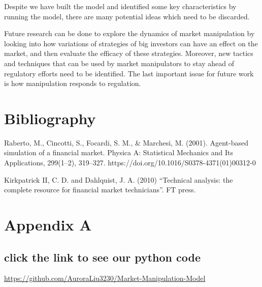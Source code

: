 \documentclass[a4paper, 12pt]{article}
\begin{document}
Despite we have built the model and identified some key characteristics by running the model, there are many potential ideas which need to be discarded. 

Future research can be done to explore the dynamics of market manipulation by looking into how variations of strategies of big investors can have an effect on the market, and then evaluate the efficacy of these strategies. Moreover, new tactics and techniques that can be used by market manipulators to stay ahead of regulatory efforts need to be identified. The last important issue for future work is how manipulation responds to regulation.

\section{Bibliography}
    \begin{thebibliography}{1}
    Raberto, M., Cincotti, S., Focardi, S. M., \& Marchesi, M. (2001). Agent-based simulation of a financial market. Physica A: Statistical Mechanics and Its Applications, 299(1–2), 319–327. https://doi.org/10.1016/S0378-4371(01)00312-0


    Kirkpatrick II, C. D. and Dahlquist, J. A. (2010) “Technical analysis: the complete resource for financial market technicians”. FT press.
    
    \end{thebibliography}
\clearpage
\section*{Appendix A}
\subsection*{click the link to see our python code}
\href{github}{https://github.com/AuroraLiu3230/Market-Manipulation-Model}


\clearpage
\end{document}
